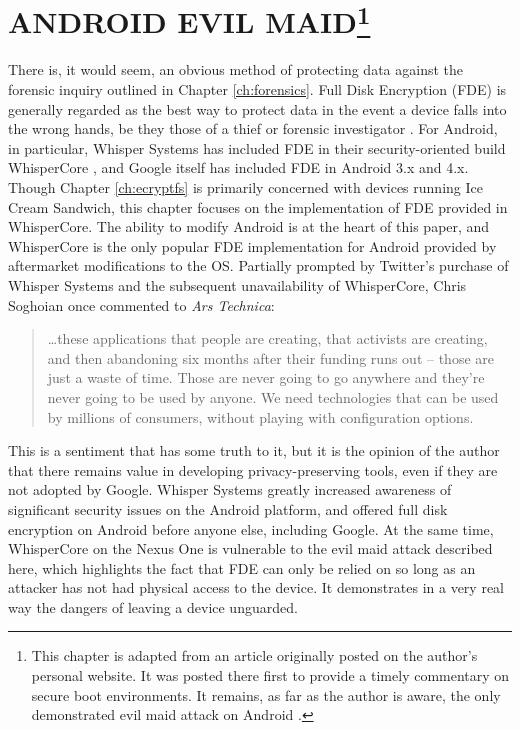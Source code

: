 \chapter[ANDROID EVIL MAID]{ANDROID EVIL MAID\protect\footnote{This chapter is adapted from an article originally posted on the author's personal
website. It was posted there first to provide a timely commentary on secure boot environments. It remains, as far as the author is
aware, the only demonstrated evil maid attack on Android \protect\cite{androidevilmaid}.}}
\label{ch:fde}

There is, it would seem, an obvious method of protecting data against the forensic inquiry outlined in Chapter \ref{ch:forensics}.
Full Disk Encryption (FDE) is generally regarded as the best way to protect data in the event a device falls into the wrong hands,
be they those of a thief or forensic investigator \cite{fdeworks}.  For Android, in particular, Whisper Systems has included FDE in their
security-oriented build WhisperCore \cite{whispercore}, and Google itself has included FDE in Android 3.x and 4.x. Though Chapter
\ref{ch:ecryptfs} is primarily concerned with devices running Ice Cream Sandwich, this chapter focuses on the implementation of FDE
provided in WhisperCore.  The ability to modify Android is at the heart of this paper, and WhisperCore is the only popular FDE
implementation for Android provided by aftermarket modifications to the OS.  Partially prompted by Twitter's purchase of Whisper
Systems and the subsequent unavailability of WhisperCore, Chris Soghoian once commented to \emph{Ars Technica}: \begin{quote} \ldots these
applications that people are creating, that activists are creating, and then abandoning six months after their funding runs out --
those are just a waste of time. Those are never going to go anywhere and they're never going to be used by anyone. We need
technologies that can be used by millions of consumers, without playing with configuration options. \cite{arstechnica} \end{quote}
This is a sentiment that has some truth to it, but it is the opinion of the author that there remains value in developing
privacy-preserving tools, even if they are not adopted by Google.  Whisper Systems greatly increased awareness of significant
security issues on the Android platform, and offered full disk encryption on Android before anyone else, including Google.  At the
same time, WhisperCore on the Nexus One is vulnerable to the evil maid attack described here, which highlights the fact that FDE can
only be relied on so long as an attacker has not had physical access to the device. It demonstrates in a very real way the dangers
of leaving a device unguarded. 

